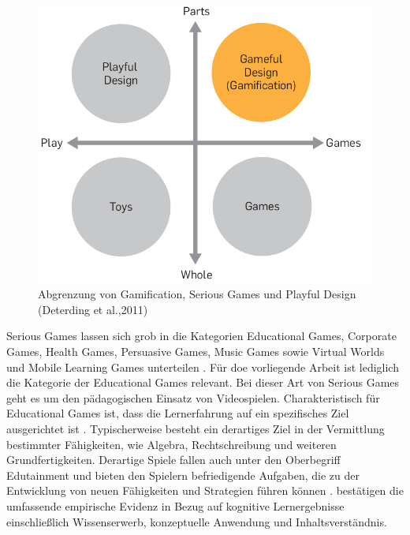 \begin{figure}[htp]
    \centering
    \includegraphics{img/detering_gamificatrion_pic.png}
    \caption{Abgrenzung von Gamification, Serious Games und Playful Design (Deterding  et  al.,2011)}
    \label{fig:deterding}
\end{figure}

Serious Games lassen sich grob in die Kategorien Educational  Games, 
Corporate  Games,  Health  Games,  Persuasive  Games,  Music  Games  sowie  Virtual  Worlds  und 
Mobile Learning Games unterteilen \cite[S.4]{bopp_serious_2009}.
Für doe vorliegende Arbeit ist lediglich die Kategorie der Educational  Games relevant.
Bei dieser Art von Serious Games geht es um den pädagogischen Einsatz von Videospielen.
Charakteristisch für Educational  Games ist, dass die Lernerfahrung auf ein spezifisches Ziel ausgerichtet ist \cite{nielsen_overview_2006, bopp_serious_2009}.
Typischerweise besteht ein derartiges Ziel in der Vermittlung bestimmter Fähigkeiten, wie Algebra, Rechtschreibung und weiteren Grundfertigkeiten.
Derartige Spiele fallen auch unter den Oberbegriff Edutainment \cite{nielsen_overview_2006} und bieten den Spielern befriedigende Aufgaben, die zu der Entwicklung von neuen Fähigkeiten und Strategien führen können \cite{stapleton_serious_2004}.
 bestätigen die umfassende empirische Evidenz in Bezug auf kognitive Lernergebnisse einschließlich Wissenserwerb, konzeptuelle Anwendung und Inhaltsverständnis.


